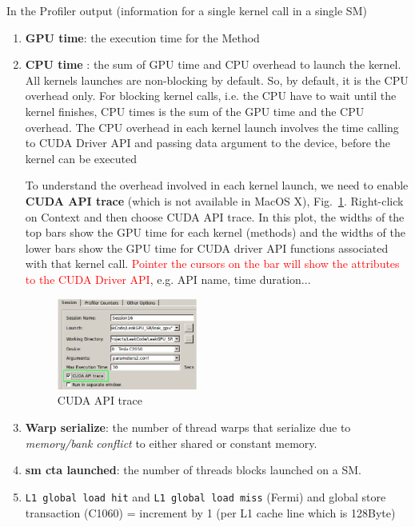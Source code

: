 In the Profiler output (information for a single kernel call in a
single SM)
\begin{enumerate}
\item {\bf GPU time}: the execution time for the Method
  
\item {\bf CPU time} : the sum of GPU time and CPU overhead to launch
  the kernel. All kernels launches are non-blocking by default. So, by
  default, it is the CPU overhead only. For blocking kernel calls,
  i.e. the CPU have to wait until the kernel finishes, CPU times is
  the sum of the GPU time and the CPU overhead. The CPU overhead in
  each kernel launch involves the time calling to CUDA Driver API and
  passing data argument to the device, before the kernel can be
  executed

  To understand the overhead involved in each kernel launch, we need
  to enable {\bf CUDA API trace} (which is not available in MacOS X),
  Fig.~\ref{fig:CUDA_API_trace}. Right-click on Context and then
  choose CUDA API trace. In this plot, the widths of the top bars show
  the GPU time for each kernel (methods) and the widths of the lower
  bars show the GPU time for CUDA driver API functions associated with
  that kernel call. \textcolor{red}{Pointer the cursors on the bar
    will show the attributes to the CUDA Driver API}, e.g. API name,
  time duration...

  \begin{figure}[hbt]
    \centerline{\includegraphics[height=3cm,
      angle=0]{./images/CUDA_API_trace.eps}}
    \caption{CUDA API trace}
    \label{fig:CUDA_API_trace}
  \end{figure}
  
\item {\bf Warp serialize}: the number of thread warps that serialize
  due to {\it memory/bank conflict} to either shared or constant
  memory. 
\item {\bf sm cta launched}: the number of threads blocks launched on
  a SM. 

\item \verb!L1 global load hit! and \verb!L1 global load miss!
  (Fermi) and global store transaction (C1060) = increment by 1 (per
  L1 cache line which is 128Byte)


\end{enumerate}
